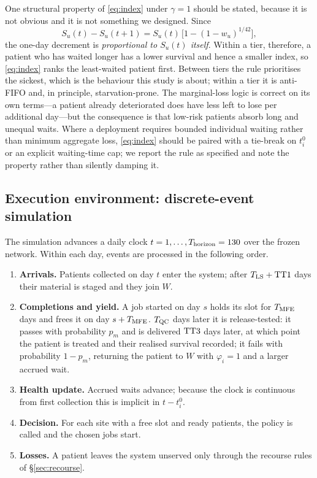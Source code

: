 One structural property of \eqref{eq:index} under $\gamma = 1$ should be stated,
because it is not obvious and it is not something we designed. Since
\[
  S_u(t) - S_u(t+1) = S_u(t)\,\bigl[1 - (1-w_u)^{1/42}\bigr],
\]
the one-day decrement is \emph{proportional to $S_u(t)$ itself}. Within a tier,
therefore, a patient who has waited longer has a lower survival and hence a
smaller index, so \eqref{eq:index} ranks the least-waited patient first. Between
tiers the rule prioritises the sickest, which is the behaviour this study is
about; within a tier it is anti-FIFO and, in principle, starvation-prone. The
marginal-loss logic is correct on its own terms---a patient already deteriorated
does have less left to lose per additional day---but the consequence is that
low-risk patients absorb long and unequal waits. Where a deployment requires
bounded individual waiting rather than minimum aggregate loss,
\eqref{eq:index} should be paired with a tie-break on $t^{0}_{i}$ or an explicit
waiting-time cap; we report the rule as specified and note the property rather
than silently damping it.

\subsection{Execution environment: discrete-event simulation}
\label{sec:sim}

The simulation advances a daily clock $t = 1, \dots, T_{\mathrm{horizon}} = 130$ over the
frozen network. Within each day, events are processed in the following order.

\begin{enumerate}
  \item \textbf{Arrivals.} Patients collected on day $t$ enter the system;
        after $T_{\mathrm{LS}} + \mathrm{TT1}$ days their material is staged and they join $W$.
  \item \textbf{Completions and yield.} A job started on day $s$ holds its slot
        for $T_{\mathrm{MFE}}$ days and frees it on day $s + T_{\mathrm{MFE}}$. $T_{\mathrm{QC}}$ days later it
        is release-tested: it passes with probability $p_m$ and is delivered
        $\mathrm{TT3}$ days later, at which point the patient is treated and their
        realised survival recorded; it fails with probability $1 - p_m$,
        returning the patient to $W$ with $\varphi_i = 1$ and a larger accrued
        wait.
  \item \textbf{Health update.} Accrued waits advance; because the clock is
        continuous from first collection this is implicit in $t - t^{0}_{i}$.
  \item \textbf{Decision.} For each site with a free slot and ready patients,
        the policy is called and the chosen jobs start.
  \item \textbf{Losses.} A patient leaves the system unserved only through the
        recourse rules of \S\ref{sec:recourse}.
\end{enumerate}

